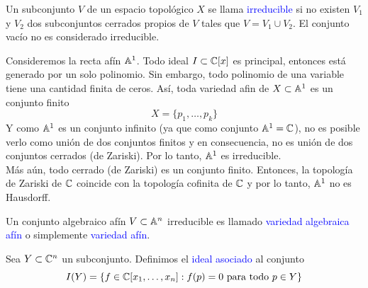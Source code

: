     \begin{definition}
        Un subconjunto $V$ de un espacio topológico $X$ se llama \textcolor{blue}{irreducible} si no existen $V_1$ y $V_2$ dos subconjuntos cerrados propios de $V$ tales que $V=V_1\cup V_2$. El conjunto vacío no es considerado irreducible.
    \end{definition}

    \begin{example}
        Consideremos la recta afín $\mathbb{A}^1$. Todo ideal $I\subset \mathbb{C}[x]$ es principal, entonces está generado por un solo polinomio. Sin embargo, todo polinomio de una variable tiene una cantidad finita de ceros. Así, toda variedad afin de $X\subset \mathbb{A}^1$ es un conjunto finito
        \begin{equation*}
            X=\{p_1,\dots,p_k\}
        \end{equation*}
        Y como $\mathbb{A}^1$ es un conjunto infinito (ya que como conjunto $\mathbb{A}^1=\mathbb{C}$), no es posible verlo como unión de dos conjuntos finitos y en consecuencia, no es unión de dos conjuntos cerrados (de Zariski). Por lo tanto, $\mathbb{A}^1$ es irreducible. \\
        Más aún, todo cerrado (de Zariski) es un conjunto finito. Entonces, la topología de Zariski de $\mathbb{C}$ coincide con la topología cofinita de $\mathbb{C}$ y por lo tanto, $\mathbb{A}^1$ no es Hausdorff.
    \end{example}

    \begin{definition}
        Un conjunto algebraico afín $V\subset\mathbb{A}^n$ irreducible es llamado \textcolor{blue}{variedad algebraica afín} o simplemente \textcolor{blue}{variedad afín}.  
    \end{definition}
    
    \begin{definition}
        Sea $Y\subset \mathbb{C}^n$ un subconjunto. Definimos el \textcolor{blue}{ideal asociado} al conjunto
        \begin{equation*}
            I(Y)=\{f\in\mathbb{C}[x_1,\dots,x_n]:f(p)=0\text{ para todo }p\in Y\}
        \end{equation*}
    \end{definition}

